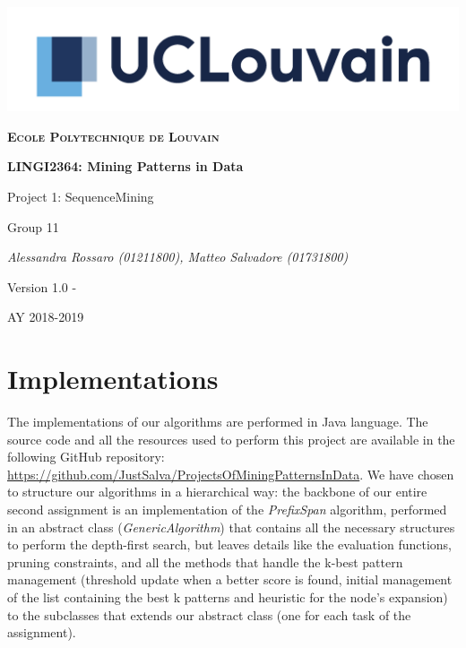 \documentclass[11pt, a4paper]{article}
\begin{document}
	\begin{titlepage}
		\centering
		\includegraphics[scale =0.8]{logo.jpg}\par\vspace{1cm}
		{\scshape\LARGE\bfseries Ecole Polytechnique de Louvain\par}
		\vspace{1.5cm}
		{\scshape\Large \par}
		\vspace{1.5cm}
		{\huge\bfseries LINGI2364: Mining Patterns in Data \par}
		\vspace{1cm}
		{\Huge Project 1: SequenceMining \par}
		\vspace{2cm}
		{\LARGE Group 11\par}
		\vspace{1cm}
		{\Large\itshape Alessandra Rossaro (01211800), Matteo Salvadore (01731800)\par}
		\vspace{2cm}
		{\small Version 1.0 - \date{\today}\par}

		\vfill

		{\large AY 2018-2019\par}
	\end{titlepage}

	\section{Implementations}
	The implementations of our algorithms are performed in Java language.\newline
	The source code and all the resources used to perform this project are available in the following GitHub repository: \url{https://github.com/JustSalva/ProjectsOfMiningPatternsInData}.
	We have chosen to structure our algorithms in a hierarchical way: the backbone of our entire second assignment is an implementation of the \textit{PrefixSpan} algorithm, performed in an abstract class (\textit{GenericAlgorithm}) that contains all the necessary structures to perform the depth-first search, but leaves details like the evaluation functions, pruning constraints, and all the methods that handle the k-best pattern management (threshold update when a better score is found, initial management of the list containing the best k patterns and heuristic for the node's expansion) to the subclasses that extends our abstract class (one for each task of the assignment).
	
\end{document}
